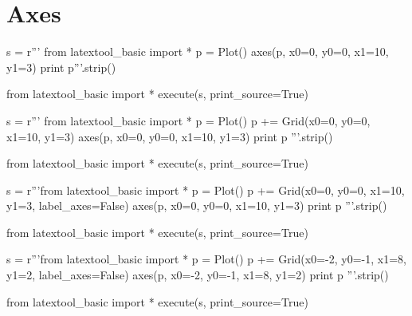 \section{Axes}
\begin{python}
s = r'''
from latextool_basic import *
p = Plot()
axes(p, x0=0, y0=0, x1=10, y1=3)
print p'''.strip()

from latextool_basic import *
execute(s, print_source=True)
\end{python}

\begin{python}
s = r'''
from latextool_basic import *
p = Plot()
p += Grid(x0=0, y0=0, x1=10, y1=3)
axes(p, x0=0, y0=0, x1=10, y1=3)
print p
'''.strip()

from latextool_basic import *
execute(s, print_source=True)
\end{python}

\begin{python}
s = r'''from latextool_basic import *
p = Plot()
p += Grid(x0=0, y0=0, x1=10, y1=3, label_axes=False)
axes(p, x0=0, y0=0, x1=10, y1=3)
print p
'''.strip()

from latextool_basic import *
execute(s, print_source=True)
\end{python}

\begin{python}
s = r'''from latextool_basic import *
p = Plot()
p += Grid(x0=-2, y0=-1, x1=8, y1=2, label_axes=False)
axes(p, x0=-2, y0=-1, x1=8, y1=2)
print p
'''.strip()

from latextool_basic import *
execute(s, print_source=True)
\end{python}
